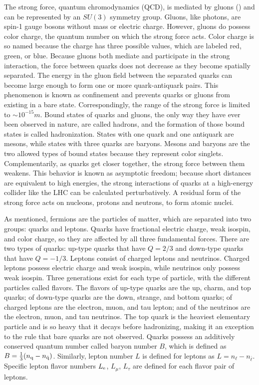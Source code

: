 The strong force, quantum chromodynamics (QCD), is mediated by gluons (\cPg) and can be represented by an $SU(3)$ symmetry group. Gluons, like photons, are spin-1 gauge bosons without mass or electric charge. However, gluons do possess color charge, the quantum number on which the strong force acts. Color charge is so named because the charge has three possible values, which are labeled red, green, or blue. Because gluons both mediate and participate in the strong interaction, the force between quarks does not decrease as they become spatially separated. The energy in the gluon field between the separated quarks can become large enough to form one or more quark-antiquark pairs. This phenomenon is known as confinement and prevents quarks or gluons from existing in a bare state. Correspondingly, the range of the strong force is limited to $\sim 10^{-15}\unit{m}$. Bound states of quarks and gluons, the only way they have ever been observed in nature, are called hadrons, and the formation of those bound states is called hadronization. States with one quark and one antiquark are mesons, while states with three quarks are baryons. Mesons and baryons are the two allowed types of bound states because they represent color singlets. Complementarily, as quarks get closer together, the strong force between them weakens. This behavior is known as asymptotic freedom; because short distances are equivalent to high energies, the strong interactions of quarks at a high-energy collider like the LHC can be calculated perturbatively. A residual form of the strong force acts on nucleons, protons and neutrons, to form atomic nuclei.

As mentioned, fermions are the particles of matter, which are separated into two groups: quarks and leptons. Quarks have fractional electric charge, weak isospin, and color charge, so they are affected by all three fundamental forces. There are two types of quarks: up-type quarks that have $Q = 2/3$ and down-type quarks that have $Q = -1/3$. Leptons consist of charged leptons and neutrinos. Charged leptons possess electric charge and weak isospin, while neutrinos only possess weak isospin. Three generations exist for each type of particle, with the different particles called flavors. The flavors of up-type quarks are the up, charm, and top quarks; of down-type quarks are the down, strange, and bottom quarks; of charged leptons are the electron, muon, and tau lepton; and of the neutrinos are the electron, muon, and tau neutrinos. The top quark is the heaviest elementary particle and is so heavy that it decays before hadronizing, making it an exception to the rule that bare quarks are not observed. Quarks possess an additively conserved quantum number called baryon number $B$, which is defined as $B = \frac{1}{3}(n_{\mathrm{q}} - n_{\bar{\mathrm{q}}})$. Similarly, lepton number $L$ is defined for leptons as $L = n_{\ell} - n_{\bar{\ell}}$. Specific lepton flavor numbers $L_{\mathrm{e}}$, $L_{\mu}$, $L_{\tau}$ are defined for each flavor pair of leptons.

